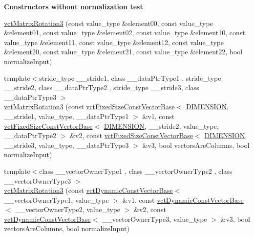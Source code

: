 \begin{Indent}{\bf Constructors without normalization test}
{\begin{DoxyItemize}
\end{DoxyItemize}}\begin{DoxyCompactItemize}
\item 
\hyperlink{classvct_matrix_rotation3_a4c2e3e5bf0547bd9c38b97789205e4d4}{vct\-Matrix\-Rotation3} (const value\-\_\-type \&element00, const value\-\_\-type \&element01, const value\-\_\-type \&element02, const value\-\_\-type \&element10, const value\-\_\-type \&element11, const value\-\_\-type \&element12, const value\-\_\-type \&element20, const value\-\_\-type \&element21, const value\-\_\-type \&element22, bool normalize\-Input)
\item 
{\footnotesize template$<$stride\-\_\-type \-\_\-\-\_\-stride1, class \-\_\-\-\_\-data\-Ptr\-Type1 , stride\-\_\-type \-\_\-\-\_\-stride2, class \-\_\-\-\_\-data\-Ptr\-Type2 , stride\-\_\-type \-\_\-\-\_\-stride3, class \-\_\-\-\_\-data\-Ptr\-Type3 $>$ }\\\hyperlink{classvct_matrix_rotation3_a8702f185e21ff2b44614e0b03a9226c0}{vct\-Matrix\-Rotation3} (const \hyperlink{classvct_fixed_size_const_vector_base}{vct\-Fixed\-Size\-Const\-Vector\-Base}$<$ \hyperlink{classvct_matrix_rotation3_aa21ad8fcafb1ab9d70efcec9bda6eab2af25ebbcafe4db62f894c21db0608cd65}{D\-I\-M\-E\-N\-S\-I\-O\-N}, \-\_\-\-\_\-stride1, value\-\_\-type, \-\_\-\-\_\-data\-Ptr\-Type1 $>$ \&v1, const \hyperlink{classvct_fixed_size_const_vector_base}{vct\-Fixed\-Size\-Const\-Vector\-Base}$<$ \hyperlink{classvct_matrix_rotation3_aa21ad8fcafb1ab9d70efcec9bda6eab2af25ebbcafe4db62f894c21db0608cd65}{D\-I\-M\-E\-N\-S\-I\-O\-N}, \-\_\-\-\_\-stride2, value\-\_\-type, \-\_\-\-\_\-data\-Ptr\-Type2 $>$ \&v2, const \hyperlink{classvct_fixed_size_const_vector_base}{vct\-Fixed\-Size\-Const\-Vector\-Base}$<$ \hyperlink{classvct_matrix_rotation3_aa21ad8fcafb1ab9d70efcec9bda6eab2af25ebbcafe4db62f894c21db0608cd65}{D\-I\-M\-E\-N\-S\-I\-O\-N}, \-\_\-\-\_\-stride3, value\-\_\-type, \-\_\-\-\_\-data\-Ptr\-Type3 $>$ \&v3, bool vectors\-Are\-Columns, bool normalize\-Input)
\item 
{\footnotesize template$<$class \-\_\-\-\_\-vector\-Owner\-Type1 , class \-\_\-\-\_\-vector\-Owner\-Type2 , class \-\_\-\-\_\-vector\-Owner\-Type3 $>$ }\\\hyperlink{classvct_matrix_rotation3_aac335f5af8a4963aadfac940161c4a0e}{vct\-Matrix\-Rotation3} (const \hyperlink{classvct_dynamic_const_vector_base}{vct\-Dynamic\-Const\-Vector\-Base}$<$ \-\_\-\-\_\-vector\-Owner\-Type1, value\-\_\-type $>$ \&v1, const \hyperlink{classvct_dynamic_const_vector_base}{vct\-Dynamic\-Const\-Vector\-Base}$<$ \-\_\-\-\_\-vector\-Owner\-Type2, value\-\_\-type $>$ \&v2, const \hyperlink{classvct_dynamic_const_vector_base}{vct\-Dynamic\-Const\-Vector\-Base}$<$ \-\_\-\-\_\-vector\-Owner\-Type3, value\-\_\-type $>$ \&v3, bool vectors\-Are\-Columns, bool normalize\-Input)

\end{DoxyCompactItemize}
\end{Indent}
